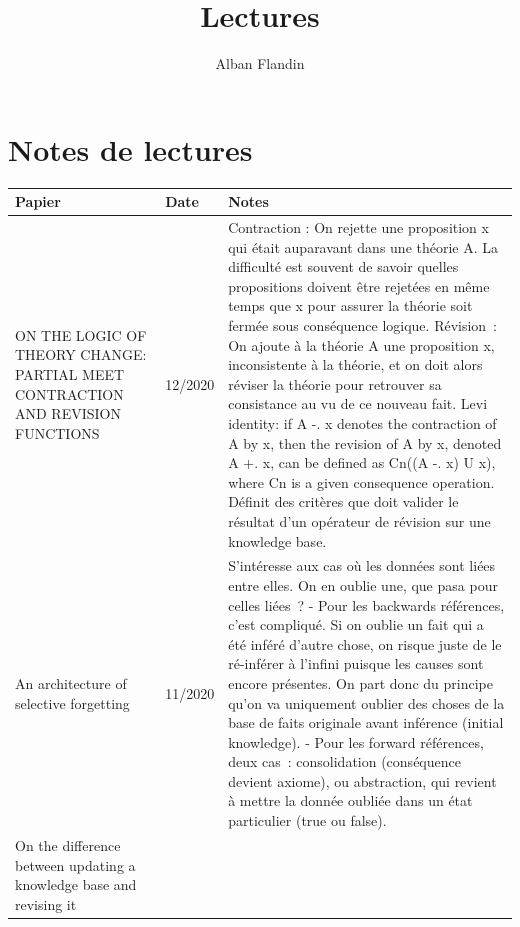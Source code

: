 \documentclass[french]{article}
\begin{document}
    \title{Lectures}
    \author{Alban Flandin}
    \maketitle

    \section{Notes de lectures}
    \begin{table}[h]
        \begin{center}
        \begin{tabular}{|p{}|p{}|p{}|}
            \hline
            Papier & Date & Notes \\
            \hline
            ON THE LOGIC OF THEORY CHANGE: PARTIAL MEET CONTRACTION AND REVISION FUNCTIONS \cite{alchourron_logic_1985}
            & 12/2020
            & Contraction : On rejette une proposition x qui était auparavant dans une théorie A. La difficulté est souvent de savoir quelles propositions doivent être rejetées en même temps que x pour assurer la théorie soit fermée sous conséquence logique. Révision : On ajoute à la théorie A une proposition x, inconsistente à la théorie, et on doit alors réviser la théorie pour retrouver sa consistance au vu de ce nouveau fait.
            Levi identity: if A -. x denotes the contraction of A by x, then the revision of A by x, denoted A +. x, can be defined as Cn((A -. x) U {x}), where Cn is a given consequence operation.
            Définit des critères que doit valider le résultat d'un opérateur de révision sur une knowledge base. \\
            \hline
            An architecture of selective forgetting \cite{euzenat_architecture_1991}
            & 11/2020
            & S’intéresse aux cas où les données sont liées entre elles. On en oublie une, que pasa pour celles liées ?
            - Pour les backwards références, c’est compliqué. Si on oublie un fait qui a été inféré d’autre chose, on risque juste de le ré-inférer à l’infini puisque les causes sont encore présentes. On part donc du principe qu’on va uniquement oublier des choses de la base de faits originale avant inférence (initial knowledge).
            - Pour les forward références, deux cas : consolidation (conséquence devient axiome), ou abstraction, qui revient à mettre la donnée oubliée dans un état particulier (true ou false).  \\
            \hline
            On the difference between updating a knowledge base and revising it \cite{katsuno_difference_1991}

\end{tabular}
\end{center}
\end{table}
\end{document}
